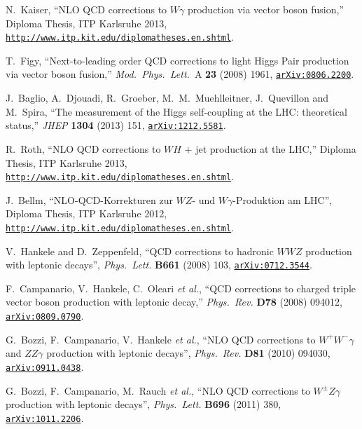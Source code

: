 \documentclass[english,12pt]{article}
\begin{document}
\begin{thebibliography}{10}
N.~Kaiser, ``NLO QCD corrections to $W\gamma$ production via vector boson fusion,'' 
{Diploma Thesis, ITP Karlsruhe 2013}, 
\href{http://www.itp.kit.edu/diplomatheses.en.shtml}{{\tt http://www.itp.kit.edu/diplomatheses.en.shtml}}.
  
  T.~Figy,
  ``Next-to-leading order QCD corrections to light Higgs Pair production via vector boson fusion,''
  {\em Mod.\ Phys.\ Lett.}\ A {\bf 23} (2008) 1961,
\href{http://www.arXiv.org/abs/0806.2200}{{\tt arXiv:0806.2200}}.

  J.~Baglio, A.~Djouadi, R.~Groeber, M.~M.~Muehlleitner, J.~Quevillon and M.~Spira,
  ``The measurement of the Higgs self-coupling at the LHC: theoretical status,''
  {\em JHEP} {\bf 1304} (2013) 151,
\href{http://www.arXiv.org/abs/1212.5581}{{\tt arXiv:1212.5581}}.

R.~Roth, ``NLO QCD corrections to $WH$ + jet production at the LHC,'' 
{Diploma Thesis, ITP Karlsruhe 2013}, 
\href{http://www.itp.kit.edu/diplomatheses.en.shtml}{{\tt http://www.itp.kit.edu/diplomatheses.en.shtml}}.
  
 J.~Bellm, ``NLO-QCD-Korrekturen zur $WZ$- und $W\gamma$-Produktion am LHC'', {Diploma Thesis, ITP Karlsruhe 2012}, 
\href{http://www.itp.kit.edu/diplomatheses.en.shtml}{{\tt http://www.itp.kit.edu/diplomatheses.en.shtml}}.

V.~Hankele and D.~Zeppenfeld, ``{QCD corrections to hadronic $WWZ$ production
  with leptonic decays}'', {\em Phys.\ Lett.} {\bf B661} (2008) 103,
\href{http://www.arXiv.org/abs/0712.3544}{{\tt arXiv:0712.3544}}.

  F.~Campanario, V.~Hankele, C.~Oleari {\it et al.},
  ``QCD corrections to charged triple vector boson production with leptonic decay,''
  {\em Phys.\ Rev.}  {\bf D78} (2008) 094012,
  \href{http://arxiv.org/abs/0809.0790}{{\tt arXiv:0809.0790}}.

  G.~Bozzi, F.~Campanario, V.~Hankele {\it et al.},
  ``{NLO QCD corrections to $W^+W^- \gamma$ and $Z Z \gamma$ production with leptonic decays}'',
  {\em Phys.\ Rev.}  {\bf D81} (2010) 094030,
\href{http://www.arXiv.org/abs/0911.0438}{{\tt arXiv:0911.0438}}.

  G.~Bozzi, F.~Campanario, M.~Rauch  {\it et al.},
  ``NLO QCD corrections to $W^\pm Z\gamma$ production with leptonic decays'',
  {\em Phys.\ Lett.} {\bf B696} (2011) 380,
\href{http://www.arXiv.org/abs/1011.2206}{{\tt arXiv:1011.2206}}.
  

\end{thebibliography}
\end{document}
